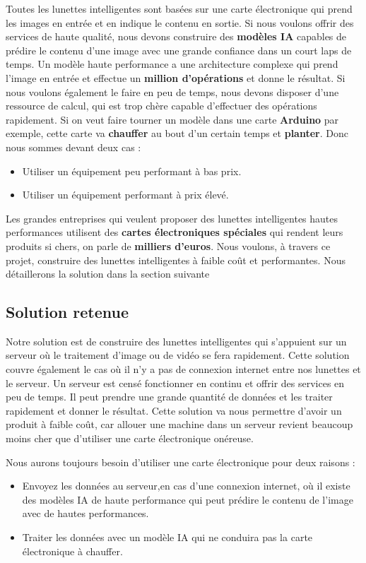 {Toutes les lunettes intelligentes sont basées sur une carte électronique qui prend les images en entrée et en indique le contenu en sortie. Si nous voulons offrir des services de haute qualité, nous devons construire des \textbf{modèles IA} capables de prédire le contenu d'une image avec une grande confiance dans un court laps de temps. Un modèle haute performance a une architecture complexe qui prend l'image en entrée et effectue un \textbf{million d'opérations} et donne le résultat. Si nous voulons également le faire en peu de temps, nous devons disposer d'une ressource de calcul, qui est trop chère capable d'effectuer des opérations rapidement. Si on veut faire tourner un modèle dans une carte \textbf{Arduino} par exemple, cette carte va \textbf{chauffer} au bout d'un certain temps et \textbf{planter}. Donc nous sommes devant deux cas :
\begin{itemize}
    \item Utiliser un équipement peu performant à bas prix.
    \item Utiliser un équipement performant à prix élevé.
\end{itemize}

Les grandes entreprises qui veulent proposer des lunettes intelligentes hautes performances utilisent des \textbf{cartes électroniques spéciales} qui rendent leurs produits si chers, on parle de \textbf{milliers d'euros}. Nous voulons, à travers ce projet, construire des lunettes intelligentes à faible coût et performantes. Nous détaillerons la solution dans la section suivante

\subsection{Solution retenue}
Notre solution est de construire des lunettes intelligentes qui s'appuient sur un serveur où le traitement d'image ou de vidéo se fera rapidement. Cette solution couvre également le cas où il n'y a pas de connexion internet entre nos lunettes et le serveur. Un serveur est censé fonctionner en continu et offrir des services en peu de temps. Il peut prendre une grande quantité de données et les traiter rapidement et donner le résultat. Cette solution va nous permettre d'avoir un produit à faible coût, car allouer une machine dans un serveur revient beaucoup moins cher que d'utiliser une carte électronique onéreuse.

Nous aurons toujours besoin d'utiliser une carte électronique pour deux raisons :

\begin{itemize}
    \item Envoyez les données au serveur,en cas d'une connexion internet, où il existe des modèles IA de haute performance qui peut prédire le contenu de l'image avec de hautes performances.
    \item Traiter les données avec un modèle IA qui ne conduira pas la carte électronique à chauffer.
\end{itemize}

}
